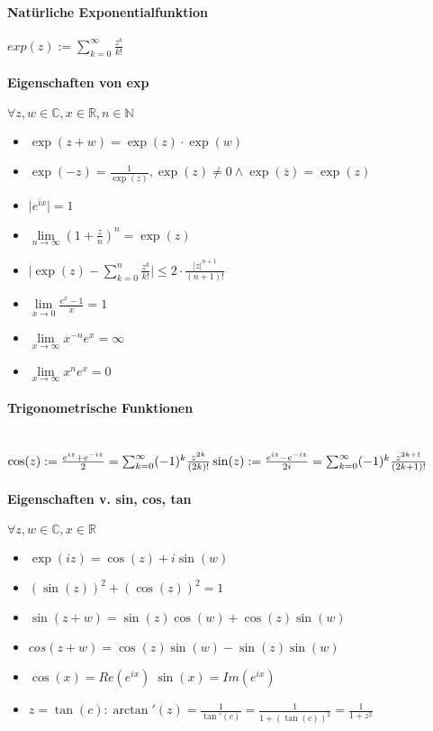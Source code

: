 \documentclass[paper=a3,paper=landscape, fontsize=9pt,DIV=25]{scrartcl}
\newcommand{\real}{{\mathbb{R}}}
\newcommand{\compl}{\mathbb{C}}
\newcommand{\nat}{\mathbb{N}}
\begin{document}
\begin{multicols*}{4}
		\paragraph{Natürliche Exponentialfunktion}
		$ exp(z) := \sum_{k=0}^{\infty} \frac{z^k}{k!}$
		\paragraph{Eigenschaften von exp}
		$\forall z,w \in \compl, x \in \real, n \in \nat$
		\begin{itemize}
			\item $\exp(z+w)=\exp(z)\cdot \exp(w)$
			\item $\exp(-z)=\frac{1}{\exp(z)}, \exp(z) \neq 0 \wedge \exp(\overline{z})=\exp(z)$
			\item $\lvert e^{ix} \rvert = 1$
			\item $\lim\limits_{n \rightarrow \infty} (1+\frac{z}{n})^n=\exp(z)$
			\item $ \lvert \exp(z)- \sum_{k=0}^{n} \frac{z^k}{k!} \rvert \leq 2 \cdot \frac{\lvert z \rvert ^{n+1}}{(n+1)!}$
			\item $ \lim\limits_{x \rightarrow 0} \frac{e^x-1}{x} = 1$
			\item $ \lim\limits_{x \rightarrow \infty} x^{-n}e^x=\infty$
			\item $ \lim\limits_{x \rightarrow \infty} x^ne^x=0$
		\end{itemize}
			\paragraph{Trigonometrische Funktionen}\hspace{0pt} \\
			$  \cos(z):=\frac{e^{iz}+e^{-iz}}{2} = \sum_{k=0}^{\infty} (-1)^k\frac{z^{2k}}{(2k)!}\\\sin(z):=\frac{e^{iz}-e^{-iz}}{2i} = \sum_{k=0}^{\infty} (-1)^k \frac{z^{2k+1}}{(2k+1)!}$
			\paragraph{Eigenschaften v. sin, cos, tan}
			$\forall z,w \in \compl, x \in \real$
			
			\begin{itemize}
				\item $\exp(iz) = \cos(z)+i\sin(w)$
				\item $(\sin(z))^2+(\cos(z))^2=1$
				\item $\sin(z+w)=\sin(z)\cos(w)+\cos(z)\sin(w)$
				\item $cos(z+w)=\cos(z)\sin(w)-\sin(z)\sin(w)$
				\item $\cos(x)=Re(e^{ix}) \; \sin(x)=Im(e^{ix})$
				\item $z=\tan(c): \arctan'(z)=\frac{1}{\tan'(c)}=\frac{1}{1+(\tan(c))^2}=\frac{1}{1+z^2}$
			\end{itemize}
		

\end{multicols*}
\end{document}
